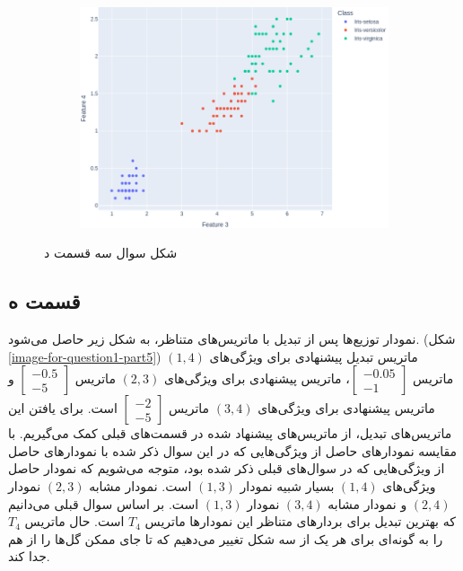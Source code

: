 \documentclass[14pt,a4]{article}
\begin{document}
\begin{figure}[h]
\begin{subfigure}{0.32\linewidth}
    \end{subfigure}
    \hfill
    \begin{subfigure}{0.32\linewidth}
        \centering
        \includegraphics[width=\linewidth]{images/q3/p4/34.png}
    \end{subfigure}
    \caption{شکل سوال سه قسمت د}
    \label{image-for-question1-part4}
\end{figure}

\subsection*{قسمت ه}

نمودار توزیع‌ها پس از تبدیل با ماتریس‌های متناظر، به شکل زیر حاصل می‌شود.
(شکل \ref{image-for-question1-part5}) ماتریس تبدیل پیشنهادی
برای ویژگی‌های $(1,4)$ ماتریس $\begin{bmatrix}-0.05 \\  -1\end{bmatrix}$، ماتریس پیشنهادی برای ویژگی‌های
$(2,3)$ ماتریس $\begin{bmatrix}-0.5\\ -5\end{bmatrix}$ و ماتریس پیشنهادی برای ویژگی‌های $(3,4)$ ماتریس
$\begin{bmatrix}-2\\ -5\end{bmatrix}$ است. برای یافتن این ماتریس‌های تبدیل، از ماتریس‌های پیشنهاد شده
در قسمت‌های قبلی کمک می‌گیریم. با مقایسه‌‌ نمودار‌های حاصل از ویژگی‌هایی که در این سوال ذکر شده با نمودار‌های
حاصل از ویژگی‌هایی که در سوال‌های قبلی ذکر شده بود، متوجه می‌شویم که نمودار‌ حاصل ویژگی‌های $(1,4)$ بسیار
شبیه نمودار $(1,3)$ است. نمودار‌ مشابه $(2,3)$ نمودار $(2,4)$ و نمودار مشابه $(3,4)$ نمودار $(1,3)$
است. بر اساس سوال قبلی می‌دانیم که بهترین تبدیل برای بردار‌های متناظر این نمودار‌ها ماتریس $T_4$
است. حال ماتریس $T_4$ را به گونه‌ای برای هر یک از سه شکل تغییر می‌دهیم که تا جای ممکن گل‌ها را از
هم جدا کند.
\end{document}
